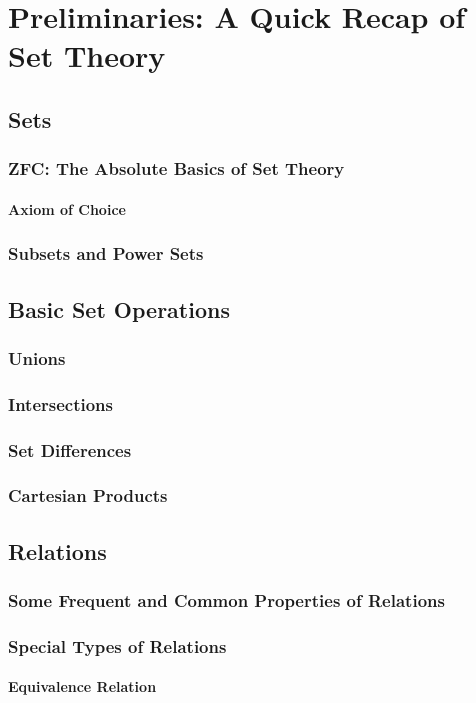 \chapter{Preliminaries: A Quick Recap of Set Theory}
\section{Sets}
\subsection{ZFC: The Absolute Basics of Set Theory}
\subsubsection{Axiom of Choice}
\subsection{Subsets and Power Sets}
\section{Basic Set Operations}
\subsection{Unions}
\subsection{Intersections}
\subsection{Set Differences}
\subsection{Cartesian Products}
\section{Relations}
\subsection{Some Frequent and Common Properties of Relations}
\subsection{Special Types of Relations}
\subsubsection{Equivalence Relation}
